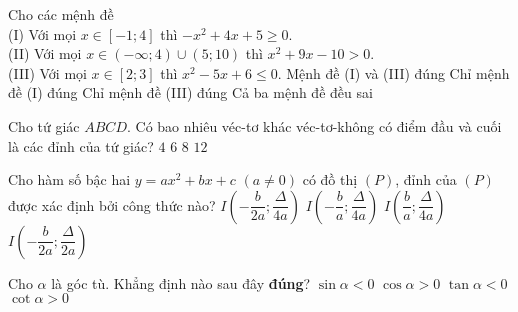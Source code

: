 \begin{ex}%
Cho các mệnh đề\\
(I) Với mọi $x \in [-1;4]$ thì $-x^2+4x+5 \geq 0$.\\
(II) Với mọi $x \in (-\infty;4) \cup (5;10)$ thì $x^2+9x-10>0$. \\
(III) Với mọi $x \in [2;3]$ thì $x^2-5x+6 \leq 0$.
\choice
{\True Mệnh đề (I) và (III) đúng}
{Chỉ mệnh đề (I) đúng}
{Chỉ mệnh đề (III) đúng}
{Cả ba mệnh đề đều sai}
\end{ex}

\begin{ex}%
Cho tứ giác $ABCD$. Có bao nhiêu véc-tơ khác véc-tơ-không có điểm đầu và cuối là các đỉnh của tứ giác?
\choice
{$4$}
{$6$}
{$8$}
{\True $12$}
\end{ex}

\begin{ex}%
Cho hàm số bậc hai $y=a{x^2}+bx+c$ $\left(a\ne 0\right)$ có đồ thị $\left(P\right)$, đỉnh của $\left(P\right)$ được xác định bởi công thức nào?
\choice
{\True $I\left(-\dfrac{b}{2a};\dfrac{\Delta}{4a}\right)$}
{$I\left(-\dfrac{b}{a};\dfrac{\Delta}{4a}\right)$}
{$I\left(\dfrac{b}{a};\dfrac{\Delta}{4a}\right)$}
{$I\left(-\dfrac{b}{2a};\dfrac{\Delta}{2a}\right)$}
\end{ex}

\begin{ex}%
Cho $\alpha$ là góc tù. Khẳng định nào sau đây \textbf{đúng}?
\choice
{$\sin \alpha<0$}
{$\cos \alpha>0$}
{\True $\tan \alpha<0$}
{$\cot \alpha>0$}
\end{ex}

